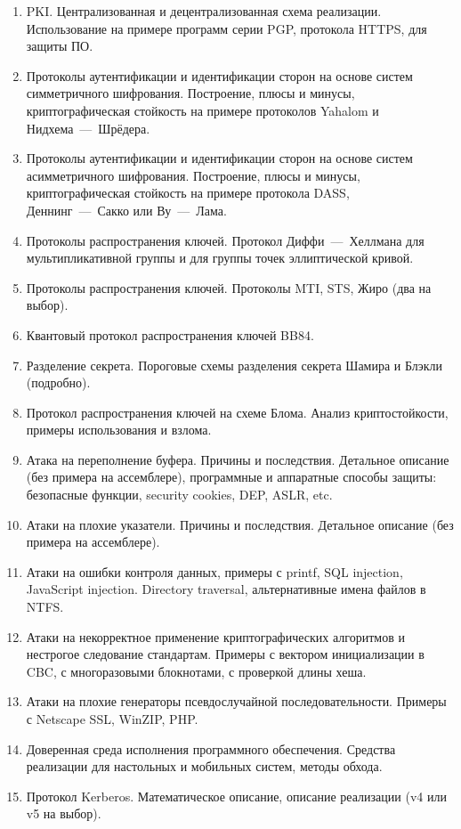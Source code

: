 \begin{enumerate}
    \item PKI. Централизованная и децентрализованная схема реализации. Использование на примере программ серии PGP, протокола HTTPS, для защиты ПО.
    \item Протоколы аутентификации и идентификации сторон на основе систем симметричного шифрования. Построение, плюсы и минусы, криптографическая стойкость на примере протоколов Yahalom и Нидхема~---~Шрёдера.
    \item Протоколы аутентификации и идентификации сторон на основе систем асимметричного шифрования. Построение, плюсы и минусы, криптографическая стойкость на примере протокола DASS, Деннинг~---~Сакко или Ву~---~Лама.
    \item Протоколы распространения ключей. Протокол Диффи~---~Хеллмана для мультипликативной группы и для группы точек эллиптической кривой.
    \item Протоколы распространения ключей. Протоколы MTI, STS, Жиро (два на выбор).
    \item Квантовый протокол распространения ключей BB84.
    \item Разделение секрета. Пороговые схемы разделения секрета Шамира и Блэкли (подробно).
    \item Протокол распространения ключей на схеме Блома. Анализ криптостойкости, примеры использования и взлома.
    \item Атака на переполнение буфера. Причины и последствия. Детальное описание (без примера на ассемблере), программные и аппаратные способы защиты: безопасные функции, security cookies, DEP, ASLR, etc.
    \item Атаки на плохие указатели. Причины и последствия. Детальное описание (без примера на ассемблере).
    \item Атаки на ошибки контроля данных, примеры с printf, \foreignlanguage{english}{SQL injection, JavaScript injection. Directory traversal}, альтернативные имена файлов в NTFS.
    \item Атаки на некорректное применение криптографических алгоритмов и нестрогое следование стандартам. Примеры с вектором инициализации в CBC, с многоразовыми блокнотами, с проверкой длины хеша.
    \item Атаки на плохие генераторы псевдослучайной последовательности. Примеры с Netscape SSL, WinZIP, PHP.
    \item Доверенная среда исполнения программного обеспечения. Средства реализации для настольных и мобильных систем, методы обхода.
    \item Протокол Kerberos. Математическое описание, описание реализации (v4 или v5 на выбор).

\end{enumerate}
